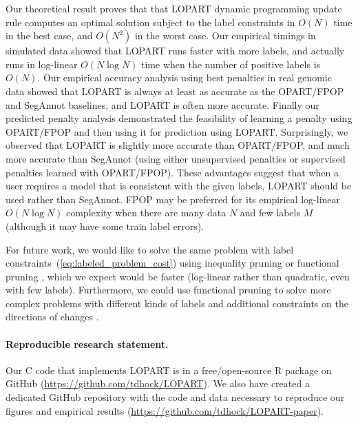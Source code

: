 \documentclass[12pt]{article}
\begin{document}
Our theoretical result proves that that LOPART dynamic programming update rule computes an optimal solution subject to the label constraints in $O(N)$ time in the best case, and $O(N^2)$ in the worst case.
Our empirical timings in simulated data showed that LOPART runs faster with more labels, and actually runs in log-linear $O(N\log N)$ time when the number of positive labels is $O(N)$.
Our empirical accuracy analysis using best penalties in real genomic data showed that LOPART is always at least as accurate as the OPART/FPOP and SegAnnot baselines, and LOPART is often more accurate.
Finally our predicted penalty analysis demonstrated the feasibility of learning a penalty using OPART/FPOP and then using it for prediction using LOPART.
Surprisingly, we observed that LOPART is slightly more accurate than OPART/FPOP, and much more accurate than SegAnnot (using either unsupervised penalties or supervised penalties learned with OPART/FPOP).
These advantages suggest that when a user requires a model that is consistent with the given labels, LOPART should be used rather than SegAnnot.
FPOP may be preferred for its empirical log-linear $O(N\log N)$ complexity when there are many data $N$ and few labels $M$ (although it may have some train label errors).

For future work, we would like to solve the same problem with label constraints~(\ref{eq:labeled_problem_cost}) using inequality pruning \citep{pelt} or functional pruning \citep{Maidstone2016}, which we expect would be faster (log-linear rather than quadratic, even with few labels). 
Furthermore, we could use functional pruning to solve more complex problems with different kinds of labels \citep{HOCKING2016-chipseq} and additional constraints on the directions of changes \citep{Hocking2017}.

\paragraph{Reproducible research statement.}
Our C code that implements LOPART is in a free/open-source R package on GitHub (\url{https://github.com/tdhock/LOPART}).
We also have created a dedicated GitHub repository with the code and data necessary to reproduce our figures and empirical results (\url{https://github.com/tdhock/LOPART-paper}).




\end{document}
